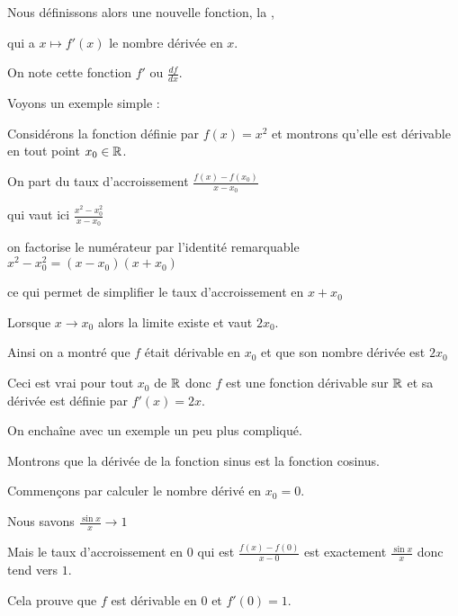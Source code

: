 Nous définissons alors une nouvelle fonction, la ,

qui a $x \mapsto f'(x)$ le nombre dérivée en $x$.

\change

On note cette fonction $f'$ ou $\frac{df}{dx}$.

\change

Voyons un exemple simple :

Considérons la fonction définie par $f(x)=x^2$  et montrons qu'elle est dérivable en tout point $x_0 \in \mathbb{R}$.

\change 

On part du taux d'accroissement $\frac{f(x)-f(x_0)}{x-x_0}$

\change 

qui vaut ici $\frac{x^2-x_0^2}{x-x_0}$

\change 

on factorise le numérateur par l'identité remarquable $x^2-x_0^2=(x-x_0)(x+x_0)$

\change 

ce qui permet de simplifier le taux d'accroissement en $x+x_0$

\change 

Lorsque $x \to x_0$ alors la limite existe et vaut $2x_0.$

\change

Ainsi on a montré que $f$ était dérivable en $x_0$ 
et que son nombre dérivée est $2x_0$


Ceci est vrai pour tout $x_0$ de $\mathbb{R}$
donc $f$ est une fonction dérivable sur $\mathbb{R}$ et sa dérivée est 
définie par $f'(x)=2x$.

\diapo

On enchaîne avec un exemple un peu plus compliqué.

Montrons que la dérivée de la fonction sinus est la fonction cosinus.

\change


Commençons par calculer le nombre dérivé en $x_0=0$.

\change

Nous savons $\frac{\sin x}{x} \to 1$

\change

Mais le taux d'accroissement en $0$ qui est
 $\frac{f(x)-f(0)}{x-0} $ est exactement $\frac{\sin x}{x}$ donc tend vers $1$.

\change

Cela prouve que $f$ est dérivable en $0$ et $f'(0)=1$.

